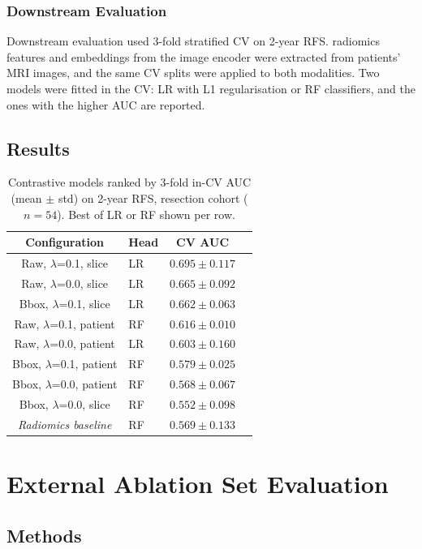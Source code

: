\documentclass[12pt,twoside]{report}
\begin{document}
\subsubsection*{Downstream Evaluation}

Downstream evaluation used 3-fold stratified CV on 2-year RFS. 
radiomics features and embeddings from the image encoder were extracted from patients' MRI images, and the same CV splits were applied to both modalities.
Two models were fitted in the CV: LR with L1 regularisation or RF classifiers, and the ones with the higher AUC are reported.

\subsection*{Results}


\begin{table}[ht]
\centering
\small
\caption{Contrastive models ranked by 3-fold in-CV AUC (mean $\pm$ std) on 2-year RFS,
resection cohort ($n=54$). Best of LR or RF shown per row.}
\label{tab:multimodal_cv}
\begin{tabular}{clcc}
\hline
Configuration & Head & CV AUC \\
\hline
Raw, $\lambda$=0.1, slice    & LR & $\mathbf{0.695 \pm 0.117}$ \\
Raw, $\lambda$=0.0, slice    & LR & $0.665 \pm 0.092$ \\
Bbox, $\lambda$=0.1, slice   & LR & $0.662 \pm 0.063$ \\
Raw, $\lambda$=0.1, patient  & RF & $0.616 \pm 0.010$ \\
Raw, $\lambda$=0.0, patient  & LR & $0.603 \pm 0.160$ \\
Bbox, $\lambda$=0.1, patient & RF & $0.579 \pm 0.025$ \\
Bbox, $\lambda$=0.0, patient & RF & $0.568 \pm 0.067$ \\
Bbox, $\lambda$=0.0, slice   & RF & $0.552 \pm 0.098$ \\
\hline
\textit{Radiomics baseline} & RF & $0.569 \pm 0.133$ \\
\hline
\end{tabular}
\end{table}



\section{External Ablation Set Evaluation}

\subsection*{Methods}
\end{document}
